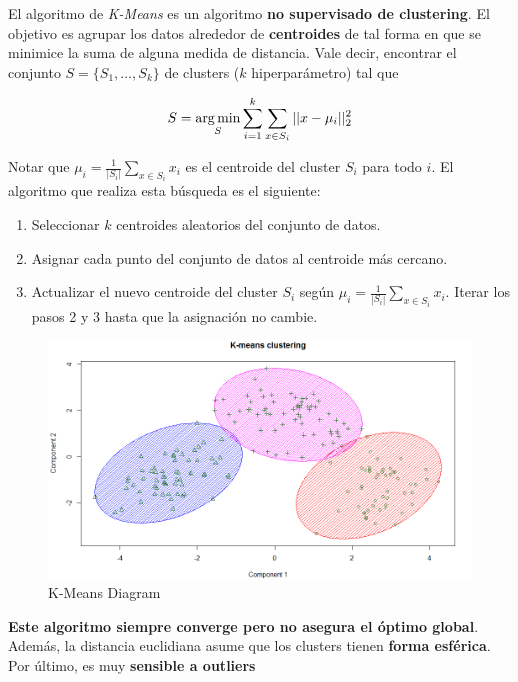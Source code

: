 El algoritmo de \textit{K-Means} es un algoritmo \textbf{no supervisado de clustering}. 
El objetivo es agrupar los datos alrededor de \textbf{centroides} de tal forma en que se minimice la suma de alguna medida de distancia. Vale decir, encontrar el conjunto $ S = \{ S_1 , \dots, S_k \} $ de clusters ($k$ hiperparámetro) tal que

\begin{equation*}
\begin{aligned}
S = \operatorname*{arg\,min}_{S} \sum_{i=1}^{k}\sum_{x \in S_i}||x- \mu_i||_{2}^2
\end{aligned}
\end{equation*}

Notar que $\mu_i = \frac{1}{|S_i|}\sum_{x \in S_i}x_i$ es el centroide del cluster $S_i$ para todo $i$. El algoritmo que realiza esta búsqueda es el siguiente: 
\begin{enumerate}
    \item Seleccionar $k$ centroides aleatorios del conjunto de datos. 
    \item Asignar cada punto del conjunto de datos al centroide más cercano. 
    \item Actualizar el nuevo centroide del cluster $S_i$ según $\mu_i = \frac{1}{|S_i|}\sum_{x \in S_i}x_i$. Iterar los pasos 2 y 3 hasta que la asignación no cambie.
\end{enumerate}

\begin{figure}[H]
    \center
    \includegraphics[scale=0.25]{notebooks/ML/img/k_means_diagram.png}
    \caption{K-Means Diagram}
\end{figure}

\textbf{Este algoritmo siempre converge pero no asegura el óptimo global}. Además, la distancia euclidiana asume que los clusters tienen \textbf{forma esférica}. Por último, es muy \textbf{sensible a outliers}

